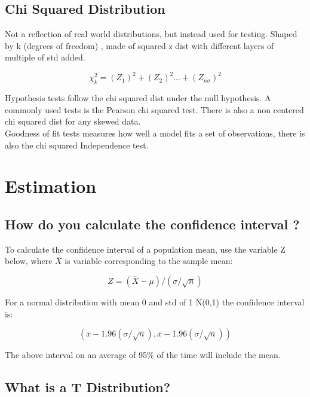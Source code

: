 \documentclass[11pt]{scrartcl} %
\begin{document}
\subsection{Chi Squared Distribution}

Not a reflection of real world distributions, but instead used for testing. Shaped by k (degrees of freedom)
, made of squared z dist with different layers of multiple of std added.

\begin{equation}
	\chi^2_{k} = (Z_1)^2 + (Z_2)^2 ... + (Z_{n\sigma})^2
\end{equation}

Hypothesis tests follow the chi squared dist under the null hypothesis. A commonly used tests is the
Pearson chi squared test. There is also a non centered chi squared dist for any skewed data.\\

Goodness of fit tests measures how well a model fits a set of observations, there is also the chi
squared Independence test.

\section{Estimation}

\subsection{How do you calculate the confidence interval
?}

To calculate the confidence interval of a population mean, use the
variable Z below, where \(\bar{X}\) is variable corresponding to the
sample mean:

\begin{equation}
	Z = (\bar{X} - \mu)/ (\sigma/ \sqrt{n})
\end{equation}

For a normal distribution with mean 0 and std of 1 N(0,1) the confidence
interval is:

\begin{equation}
	(\bar{x} - 1.96 (\sigma/\sqrt{n}),\bar{x} - 1.96 (\sigma/\sqrt{n}))
\end{equation}

The above interval on an average of 95\% of the time will include the
mean.

\subsection{What is a T
Distribution?}
\end{document}

